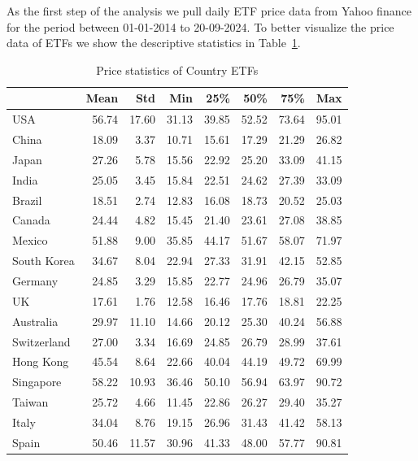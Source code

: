 \documentclass[a4paper,12pt,twoside]{article}
\begin{document}
As the first step of the analysis we pull daily ETF price data from Yahoo finance for the period between 01-01-2014 to 20-09-2024.  To better visualize the price data of ETFs we show the descriptive statistics in Table~\ref{tab:summary_stats_price}.

\begin{table}[h!]
\centering
\begin{tabular}{lrrrrrrr}
\hline
\textbf{} & \textbf{Mean} & \textbf{Std} & \textbf{Min} & \textbf{25\%} & \textbf{50\%} & \textbf{75\%} & \textbf{Max} \\
\hline
USA         &  56.74 &  17.60 & 31.13 & 39.85 & 52.52 & 73.64 & 95.01 \\
China       &  18.09 &   3.37 & 10.71 & 15.61 & 17.29 & 21.29 & 26.82 \\
Japan       &  27.26 &   5.78 & 15.56 & 22.92 & 25.20 & 33.09 & 41.15 \\
India       &  25.05 &   3.45 & 15.84 & 22.51 & 24.62 & 27.39 & 33.09 \\
Brazil      &  18.51 &   2.74 & 12.83 & 16.08 & 18.73 & 20.52 & 25.03 \\
Canada      &  24.44 &   4.82 & 15.45 & 21.40 & 23.61 & 27.08 & 38.85 \\
Mexico      &  51.88 &   9.00 & 35.85 & 44.17 & 51.67 & 58.07 & 71.97 \\
South Korea &  34.67 &   8.04 & 22.94 & 27.33 & 31.91 & 42.15 & 52.85 \\
Germany     &  24.85 &   3.29 & 15.85 & 22.77 & 24.96 & 26.79 & 35.07 \\
UK          &  17.61 &   1.76 & 12.58 & 16.46 & 17.76 & 18.81 & 22.25 \\
Australia   &  29.97 &  11.10 & 14.66 & 20.12 & 25.30 & 40.24 & 56.88 \\
Switzerland &  27.00 &   3.34 & 16.69 & 24.85 & 26.79 & 28.99 & 37.61 \\
Hong Kong   &  45.54 &   8.64 & 22.66 & 40.04 & 44.19 & 49.72 & 69.99 \\
Singapore   &  58.22 &  10.93 & 36.46 & 50.10 & 56.94 & 63.97 & 90.72 \\
Taiwan      &  25.72 &   4.66 & 11.45 & 22.86 & 26.27 & 29.40 & 35.27 \\
Italy       &  34.04 &   8.76 & 19.15 & 26.96 & 31.43 & 41.42 & 58.13 \\
Spain       &  50.46 &  11.57 & 30.96 & 41.33 & 48.00 & 57.77 & 90.81 \\
\hline
\end{tabular}
\caption{Price statistics of Country ETFs}
\label{tab:summary_stats_price}
\end{table}
\end{document}
